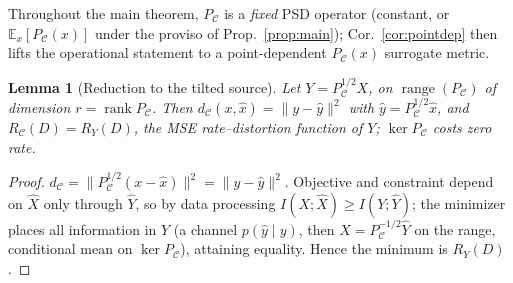 \documentclass[lettersize,onecolumn]{IEEEtran}
\newtheorem{lemma}{Lemma}
\theoremstyle{definition}
\theoremstyle{remark}
\newcommand{\PC}{P_{\mathcal{C}}}
\newcommand{\E}{\mathbb{E}}
\begin{document}
Throughout the main theorem, $\PC$ is a \emph{fixed} PSD operator (constant, or
$\E_x[\PC(x)]$ under the proviso of Prop.~\ref{prop:main}); Cor.~\ref{cor:pointdep}
then lifts the operational statement to a point-dependent $\PC(x)$ surrogate metric.

\begin{lemma}[Reduction to the tilted source]\label{lem:tilt}
Let $Y=\PC^{1/2}X$, on $\operatorname{range}(\PC)$ of dimension $r=\operatorname{rank}\PC$.
Then $d_{\mathcal{C}}(x,\hat x)=\|y-\hat y\|^2$ with $\hat y=\PC^{1/2}\hat x$, and
$R_{\mathcal{C}}(D)=R_Y(D)$, the MSE rate--distortion function of $Y$; $\ker\PC$ costs
zero rate.
\end{lemma}
\begin{proof}
$d_{\mathcal{C}}=\|\PC^{1/2}(x-\hat x)\|^2=\|y-\hat y\|^2$. Objective and constraint
depend on $\hat X$ only through $\hat Y$, so by data processing $I(X;\hat X)\ge
I(Y;\hat Y)$; the minimizer places all information in $Y$ (a channel $p(\hat y\mid y)$,
then $\hat X=\PC^{-1/2}\hat Y$ on the range, conditional mean on $\ker\PC$), attaining
equality. Hence the minimum is $R_Y(D)$.
\end{proof}
\end{document}
